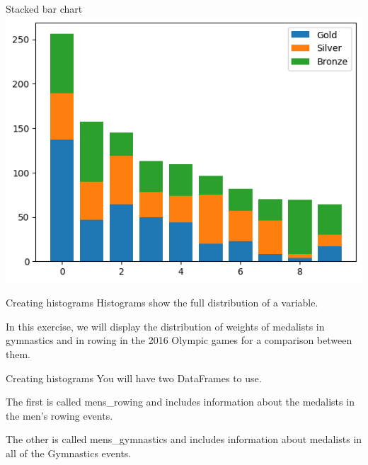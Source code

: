 \documentclass[
  ignorenonframetext,
]{beamer}
\begin{document}
\begin{frame}{Stacked bar chart}
\label{stacked-bar-chart-5}
\includegraphics{../images/im241.png}
\end{frame}

\begin{frame}{Creating histograms}
\label{creating-histograms}
Histograms show the full distribution of a variable.

In this exercise, we will display the distribution of weights of
medalists in gymnastics and in rowing in the 2016 Olympic games for a
comparison between them.
\end{frame}

\begin{frame}{Creating histograms}
\label{creating-histograms-1}
You will have two DataFrames to use.

The first is called mens\_rowing and includes information about the
medalists in the men's rowing events.

The other is called mens\_gymnastics and includes information about
medalists in all of the Gymnastics events.
\end{frame}
\end{document}
